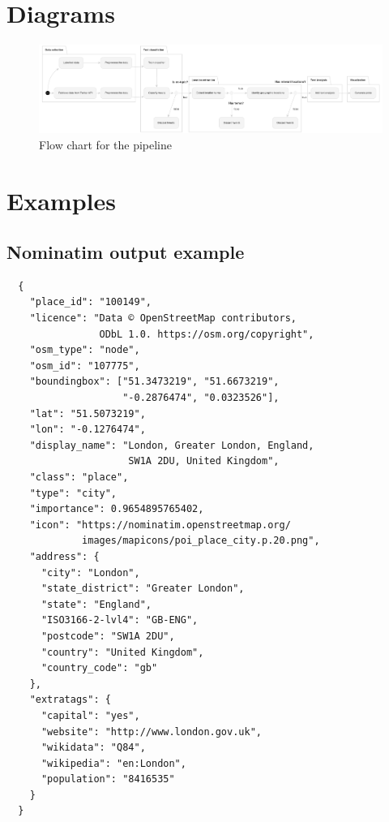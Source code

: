 \appendix
\chapter{Diagrams}\label{appendix:raw}
\begin{figure}
\begin{center}
  \includegraphics[angle=90, width=\dimexpr\textwidth-11cm\relax, height=\textheight, keepaspectratio]{./images/pipeline.png}
\end{center}
\caption{Flow chart for the pipeline}
\label{fig:flow_chart_big}
\end{figure}
\chapter{Examples}\label{appendix:examples}
\section{Nominatim output example}
 \begin{verbatim}
  {
    "place_id": "100149",
    "licence": "Data © OpenStreetMap contributors, 
                ODbL 1.0. https://osm.org/copyright",
    "osm_type": "node",
    "osm_id": "107775",
    "boundingbox": ["51.3473219", "51.6673219", 
                    "-0.2876474", "0.0323526"],
    "lat": "51.5073219",
    "lon": "-0.1276474",
    "display_name": "London, Greater London, England, 
                     SW1A 2DU, United Kingdom",
    "class": "place",
    "type": "city",
    "importance": 0.9654895765402,
    "icon": "https://nominatim.openstreetmap.org/
             images/mapicons/poi_place_city.p.20.png",
    "address": {
      "city": "London",
      "state_district": "Greater London",
      "state": "England",
      "ISO3166-2-lvl4": "GB-ENG",
      "postcode": "SW1A 2DU",
      "country": "United Kingdom",
      "country_code": "gb"
    },
    "extratags": {
      "capital": "yes",
      "website": "http://www.london.gov.uk",
      "wikidata": "Q84",
      "wikipedia": "en:London",
      "population": "8416535"
    }
  }                           
  \end{verbatim}
                
